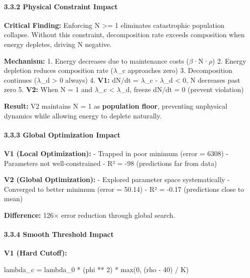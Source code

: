 \documentclass[
]{article}
\newenvironment{Shaded}{}{}
\newcommand{\BuiltInTok}[1]{\textcolor[rgb]{0.00,0.50,0.00}{#1}}
\newcommand{\DecValTok}[1]{\textcolor[rgb]{0.25,0.63,0.44}{#1}}
\newcommand{\NormalTok}[1]{#1}
\newcommand{\OperatorTok}[1]{\textcolor[rgb]{0.40,0.40,0.40}{#1}}
\begin{document}
\paragraph{3.3.2 Physical Constraint
Impact}\label{physical-constraint-impact}

\textbf{Critical Finding:} Enforcing N \textgreater= 1 eliminates
catastrophic population collapse. Without this constraint, decomposition
rate exceeds composition when energy depletes, driving N negative.

\textbf{Mechanism:} 1. Energy decreases due to maintenance costs ($\beta$·N·$\rho$)
2. Energy depletion reduces composition rate ($\lambda$\_c approaches zero) 3.
Decomposition continues ($\lambda$\_d \textgreater{} 0 always) 4. \textbf{V1:}
dN/dt = $\lambda$\_c - $\lambda$\_d \textless{} 0, N decreases past zero 5. \textbf{V2:}
When N = 1 and $\lambda$\_c \textless{} $\lambda$\_d, freeze dN/dt = 0 (prevent
violation)

\textbf{Result:} V2 maintains N = 1 as \textbf{population floor},
preventing unphysical dynamics while allowing energy to deplete
naturally.

\paragraph{3.3.3 Global Optimization
Impact}\label{global-optimization-impact}

\textbf{V1 (Local Optimization):} - Trapped in poor minimum (error =
6308) - Parameters not well-constrained - R² = -98 (predictions far from
data)

\textbf{V2 (Global Optimization):} - Explored parameter space
systematically - Converged to better minimum (error = 50.14) - R² =
-0.17 (predictions close to mean)

\textbf{Difference:} 126× error reduction through global search.

\paragraph{3.3.4 Smooth Threshold Impact}\label{smooth-threshold-impact}

\textbf{V1 (Hard Cutoff):}

\begin{Shaded}
\begin{Highlighting}[]
\NormalTok{lambda\_c }\OperatorTok{=}\NormalTok{ lambda\_0 }\OperatorTok{*}\NormalTok{ (phi }\OperatorTok{**} \DecValTok{2}\NormalTok{) }\OperatorTok{*} \BuiltInTok{max}\NormalTok{(}\DecValTok{0}\NormalTok{, (rho }\OperatorTok{{-}} \DecValTok{40}\NormalTok{) }\OperatorTok{/}\NormalTok{ K)}
\end{Highlighting}
\end{Shaded}
\end{document}
